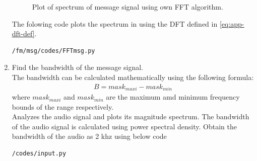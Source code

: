 \begin{enumerate}[label=\arabic*.,ref=\thesection.\theenumi]
\begin{figure}[H]
		\caption{Plot of spectrum of message signal using own FFT algorithm.}
		\label{fig:FFTo}
		\end{figure}
		The folowing code plots the spectrum in  using the DFT defined in  
	\eqref{eq:app-dft-def}.
\begin{lstlisting}
/fm/msg/codes/FFTmsg.py
\end{lstlisting}

\item Find the bandwidth of the message signal.\\
\solution The bandwidth can be calculated mathematically using the following formula:
\begin{align*}
B=mask_{maxi}-mask_{min}
\end{align*}
where $mask_{maxi}$ and $mask_{min} $ are the maximum amd minimum frequency bounds of the range  respectively.\\
Analyzes the audio signal and plots its magnitude spectrum. The bandwidth of the audio signal is  calculated using power spectral density. Obtain the bandwidth of the audio as 2 khz using below code
\begin{lstlisting}
/codes/input.py
\end{lstlisting}
\end{enumerate}
